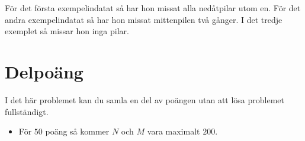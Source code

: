 För det första exempelindatat så har hon missat alla nedåtpilar utom
en. För det andra exempelindatat så har hon missat mittenpilen två
gånger. I det tredje exemplet så missar hon inga pilar.

\section*{Delpoäng}

I det här problemet kan du samla en del av poängen utan att
lösa problemet fullständigt.

\begin{itemize}
    \item För $50$ poäng så kommer $N$ och $M$ vara maximalt $200$.
\end{itemize}
